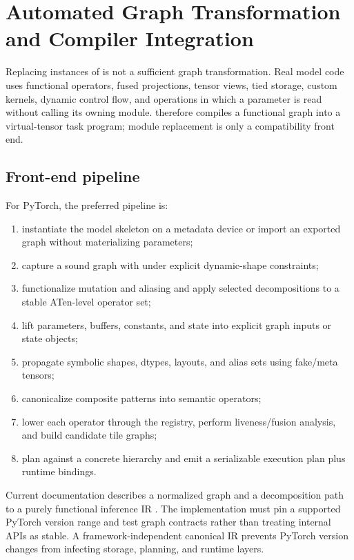 \section{Automated Graph Transformation and Compiler Integration}
\label{sec:compiler}

Replacing instances of  is not a sufficient graph transformation. Real model code uses functional operators, fused projections, tensor views, tied storage, custom kernels, dynamic control flow, and operations in which a parameter is read without calling its owning module. \AMS therefore compiles a functional graph into a virtual-tensor task program; module replacement is only a compatibility front end.

\subsection{Front-end pipeline}

For PyTorch, the preferred pipeline is:

\begin{enumerate}
  \item instantiate the model skeleton on a metadata device or import an exported graph without materializing parameters;
  \item capture a sound graph with  under explicit dynamic-shape constraints;
  \item functionalize mutation and aliasing and apply selected decompositions to a stable ATen-level operator set;
  \item lift parameters, buffers, constants, and state into explicit graph inputs or state objects;
  \item propagate symbolic shapes, dtypes, layouts, and alias sets using fake/meta tensors;
  \item canonicalize composite patterns into \AMS semantic operators;
  \item lower each operator through the registry, perform liveness/fusion analysis, and build candidate tile graphs;
  \item plan against a concrete hierarchy and emit a serializable execution plan plus runtime bindings.
\end{enumerate}

Current  documentation describes a normalized graph and a decomposition path to a purely functional inference IR \cite{pytorch_export}. The implementation must pin a supported PyTorch version range and test graph contracts rather than treating internal APIs as stable. A framework-independent canonical IR prevents PyTorch version changes from infecting storage, planning, and runtime layers.


